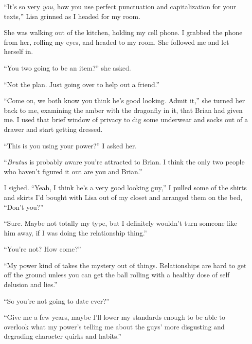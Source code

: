 ``It's so very \emph{you}, how you use perfect punctuation and capitalization for your texts,'' Lisa grinned as I headed for my room.



She was walking out of the kitchen, holding my cell phone.  I grabbed the phone from her, rolling my eyes, and headed to my room.  She followed me and let herself in.



``You two going to be an item?'' she asked.



``Not the plan.  Just going over to help out a friend.''



``Come on, we both know you think he's good looking.  Admit it,'' she turned her back to me, examining the amber with the dragonfly in it, that Brian had given me.  I used that brief window of privacy to dig some underwear and socks out of a drawer and start getting dressed.



``This is you using your power?''  I asked her.



``\emph{Brutus} is probably aware you're attracted to Brian.  I think the only two people who haven't figured it out are you and Brian.''



I sighed.  ``Yeah, I think he's a very good looking guy,'' I pulled some of the shirts and skirts I'd bought with Lisa out of my closet and arranged them on the bed, ``Don't you?''



``Sure.  Maybe not totally my type, but I definitely wouldn't turn someone like him away, if I was doing the relationship thing.''



``You're not?  How come?''



``My power kind of takes the mystery out of things.  Relationships are hard to get off the ground unless you can get the ball rolling with a healthy dose of self delusion and lies.''



``So you're not going to date ever?''



``Give me a few years, maybe I'll lower my standards enough to be able to overlook what my power's telling me about the guys' more disgusting and degrading character quirks and habits.''



